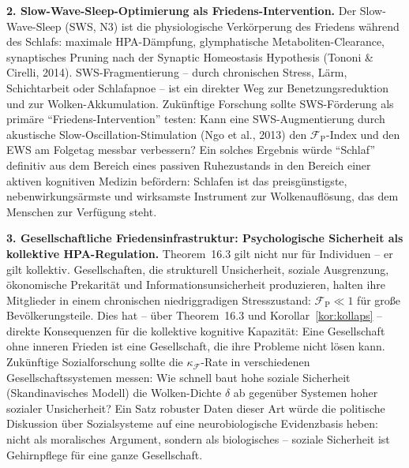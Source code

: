 ﻿\documentclass[12pt,a4paper]{report}
\theoremstyle{plain}
\theoremstyle{definition}
\theoremstyle{remark}
\begin{document}
	\textbf{2. Slow-Wave-Sleep-Optimierung als Friedens-Intervention.}
	Der Slow-Wave-Sleep (SWS, N3) ist die physiologische Verkörperung
	des Friedens während des Schlafs: maximale HPA-Dämpfung,
	glymphatische Metaboliten-Clearance, synaptisches Pruning
	nach der Synaptic Homeostasis Hypothesis (Tononi \& Cirelli, 2014).
	SWS-Fragmentierung -- durch chronischen Stress, Lärm, Schicht\-arbeit
	oder Schlafapnoe -- ist ein direkter Weg zur Benetzungsreduktion und
	zur Wolken-Akkumulation.
	Zukünftige Forschung sollte SWS-Förderung als primäre
	``Friedens-Intervention'' testen: Kann eine SWS-Augmentierung
	durch akustische Slow-Oscillation-Stimulation (Ngo et al., 2013)
	den $\mathcal{F}_{\mathrm{P}}$-Index und den EWS am Folgetag
	messbar verbessern?
	Ein solches Ergebnis würde ``Schlaf'' definitiv aus dem Bereich
	eines passiven Ruhezustands in den Bereich einer aktiven
	kognitiven Medizin befördern: Schlafen ist das preisgünstigste,
	nebenwirkungsärmste und wirksamste Instrument zur
	Wolkenauflösung, das dem Menschen zur Verfügung steht.

	\textbf{3. Gesellschaftliche Friedensinfrastruktur: Psychologische
		Sicherheit als kollektive HPA-Regulation.}
	Theorem~16.3 gilt nicht nur für Individuen -- er gilt kollektiv.
	Gesellschaften, die strukturell Unsicherheit, soziale Ausgrenzung,
	ökonomische Prekarität und Informationsunsicherheit produzieren,
	halten ihre Mitglieder in einem chronischen niedriggradigen
	Stresszustand: $\mathcal{F}_{\mathrm{P}} \ll 1$ für große
	Bevölkerungsteile.
	Dies hat -- über Theorem~16.3 und Korollar~\ref{kor:kollaps} --
	direkte Konsequenzen für die kollektive kognitive Kapazität:
	Eine Gesellschaft ohne inneren Frieden ist eine Gesellschaft,
	die ihre Probleme nicht lösen kann.
	Zukünftige Sozialforschung sollte die $\kappa_\mathcal{F}$-Rate
	in verschiedenen Gesellschaftssystemen messen:
	Wie schnell baut hohe soziale Sicherheit (Skandinavisches Modell)
	die Wolken-Dichte $\delta$ ab gegenüber Systemen hoher sozialer
	Unsicherheit?
	Ein Satz robuster Daten dieser Art würde die politische Diskussion
	über Sozialsysteme auf eine neurobiologische Evidenzbasis heben:
	nicht als moralisches Argument, sondern als biologisches --
	soziale Sicherheit ist Gehirnpflege für eine ganze Gesellschaft.
\end{document}
